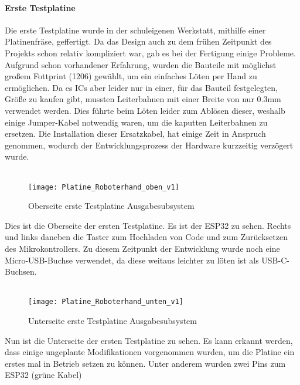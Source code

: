 \documentclass[titlepage,12pt,twoside]{article}
\begin{document}
\paragraph{Erste Testplatine}
\hfill \break
\hfill \break
Die erste Testplatine wurde in der schuleigenen Werkstatt, mithilfe einer Platinenfräse, geffertigt. Da das Design auch zu dem frühen Zeitpunkt des Projekts schon relativ kompliziert war, gab es bei der Fertigung einige Probleme.
Aufgrund schon vorhandener Erfahrung, wurden die Bauteile mit möglichst großem Fottprint (1206) gewählt, um ein einfaches Löten per Hand zu ermöglichen. Da es ICs aber leider nur in einer, für das Bauteil festgelegten, Größe zu kaufen gibt,
mussten Leiterbahnen mit einer Breite von nur 0.3mm verwendet werden. Dies führte beim Löten leider zum Ablösen dieser, weshalb einige Jumper-Kabel notwendig waren, um die kaputten Leiterbahnen zu ersetzen. Die Installation dieser 
Ersatzkabel, hat einige Zeit in Anspruch genommen, wodurch der Entwicklungsprozess der Hardware kurzzeitig verzögert wurde. \\
\\ 
\begin{figure}[H]
	\begin{center}
		\scalebox{0.8}
		{\texttt{[image: Platine\_Roboterhand\_oben\_v1]}}
		\caption{Oberseite erste Testplatine Ausgabesubsystem}
		\label{fig:Platine_Roboterhand_oben_v1}		
	\end{center}
\end{figure}
\hfill \break
Dies ist die Oberseite der ersten Testplatine. Es ist der ESP32 zu sehen. Rechts und links daneben die Taster zum Hochladen von Code und zum Zurücksetzen des Mikrokontrollers. Zu diesem Zeitpunkt der Entwicklung wurde noch eine Micro-USB-Buchse
verwendet, da diese weitaus leichter zu löten ist als USB-C-Buchsen. \\
\\
\begin{figure}[H]
	\begin{center}
		\scalebox{0.8}
		{\texttt{[image: Platine\_Roboterhand\_unten\_v1]}}
		\caption{Unterseite erste Testplatine Ausgabesubsystem}
		\label{fig:Platine_Roboterhand_unten_v1}		
	\end{center}
\end{figure}
\hfill \break
Nun ist die Unterseite der ersten Testplatine zu sehen. Es kann erkannt werden, dass einige ungeplante Modifikationen vorgenommen wurden, um die Platine ein erstes mal in Betrieb setzen zu können. Unter anderem wurden zwei Pins zum ESP32 (grüne Kabel)
\end{document}
